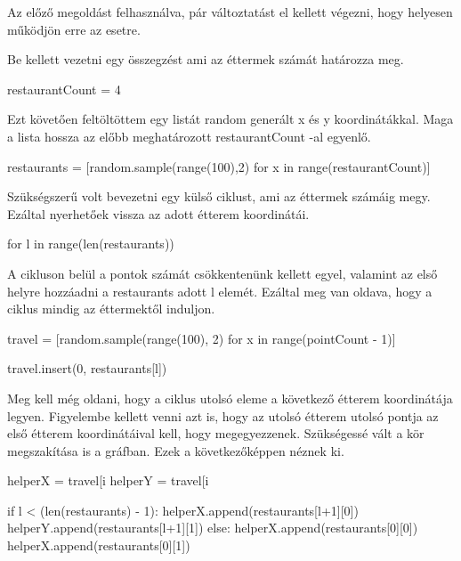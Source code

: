 
Az előző megoldást felhasználva, pár változtatást el kellett végezni, hogy helyesen működjön erre az esetre.

Be kellett vezetni egy összegzést ami az éttermek számát határozza meg.
\begin{python}
restaurantCount = 4
\end{python}

Ezt követően feltöltöttem egy listát random generált x és y koordinátákkal. Maga a lista hossza az előbb meghatározott restaurantCount -al egyenlő.

\begin{python}
restaurants = [random.sample(range(100),2) for x in range(restaurantCount)] 
\end{python}

Szükségszerű volt bevezetni egy külső ciklust, ami az éttermek számáig megy. Ezáltal nyerhetőek vissza az adott étterem koordinátái.

\begin{python}
for l in range(len(restaurants))
\end{python}

A cikluson belül a pontok számát csökkentenünk kellett egyel, valamint az első helyre hozzáadni a restaurants adott l elemét. Ezáltal meg van oldava, hogy a ciklus mindig az éttermektől induljon.

\begin{python}
travel = [random.sample(range(100), 2) for x in range(pointCount - 1)]

travel.insert(0, restaurants[l])
\end{python}

Meg kell még oldani, hogy a ciklus utolsó eleme a következő étterem koordinátája legyen. Figyelembe kellett venni azt is, hogy az utolsó étterem utolsó pontja az első étterem koordinátáival kell, hogy megegyezzenek. Szükségessé vált a kör megszakítása is a gráfban. 
Ezek a következőképpen néznek ki. 

\begin{python}
helperX = travel[i %
helperY = travel[i %

if l < (len(restaurants) - 1):
	helperX.append(restaurants[l+1][0])
	helperY.append(restaurants[l+1][1])
else:
	helperX.append(restaurants[0][0])
	helperX.append(restaurants[0][1])
\end{python}


